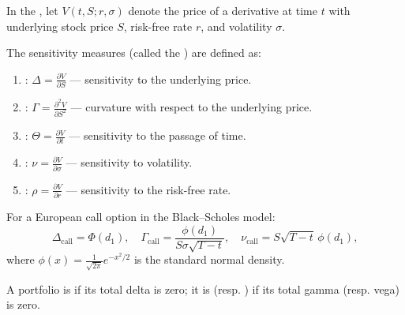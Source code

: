 \begin{definition} \label{definition:the_greeks_delta_gamma_theta_vega_rho_for_option_prices}
In the , let $V(t, S; r, \sigma)$ denote the price of a derivative at time $t$ with underlying stock price $S$, risk-free rate $r$, and volatility $\sigma$.

The sensitivity measures (called the ) are defined as:

\begin{enumerate}
    \item {}: $\Delta = \frac{\partial V}{\partial S}$ — sensitivity to the underlying price.
    \item {}: $\Gamma = \frac{\partial^2 V}{\partial S^2}$ — curvature with respect to the underlying price.
    \item {}: $\Theta = \frac{\partial V}{\partial t}$ — sensitivity to the passage of time.
    \item {}: $\nu = \frac{\partial V}{\partial \sigma}$ — sensitivity to volatility.
    \item {}: $\rho = \frac{\partial V}{\partial r}$ — sensitivity to the risk-free rate.
\end{enumerate}

For a European call option in the Black--Scholes model:
$$\Delta_{\text{call}} = \Phi(d_1), \quad \Gamma_{\text{call}} = \frac{\phi(d_1)}{S\sigma\sqrt{T-t}}, \quad \nu_{\text{call}} = S\sqrt{T-t} \, \phi(d_1),$$
where $\phi(x) = \tfrac{1}{\sqrt{2\pi}} e^{-x^2/2}$ is the standard normal density.

A portfolio is  if its total delta is zero; it is  (resp. ) if its total gamma (resp. vega) is zero.
\end{definition}
